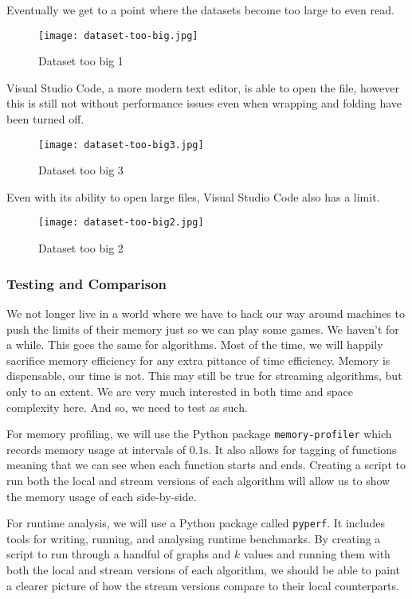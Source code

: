 Eventually we get to a point where the datasets become too large to even read.

\begin{figure}[htb]
    \centering
    \texttt{[image: dataset-too-big.jpg]}
    \caption{Dataset too big 1}
\end{figure}

Visual Studio Code, a more modern text editor, is able to open the file,
however this is still not without performance issues even when wrapping and
folding have been turned off.

\begin{figure}[htb]
    \centering
    \texttt{[image: dataset-too-big3.jpg]}
    \caption{Dataset too big 3}
\end{figure}

Even with its ability to open large files, Visual Studio Code also has a limit.

\begin{figure}[htb]
    \centering
    \texttt{[image: dataset-too-big2.jpg]}
    \caption{Dataset too big 2}
\end{figure}

\subsubsection{Testing and Comparison}

We not longer live in a world where we have to hack our way around machines to
push the limits of their memory just so we can play some games. We haven't for
a while. This goes the same for algorithms. Most of the time, we will happily
sacrifice memory efficiency for any extra pittance of time efficiency. Memory
is dispensable, our time is not. This may still be true for streaming
algorithms, but only to an extent. We are very much interested in both time and
space complexity here. And so, we need to test as such.

For memory profiling, we will use the Python package \texttt{memory-profiler}
which records memory usage at intervals of \(0.1\text{s}\). It also allows for
tagging of functions meaning that we can see when each function starts and
ends. Creating a script to run both the local and stream versions of each
algorithm will allow us to show the memory usage of each side-by-side.

For runtime analysis, we will use a Python package called \texttt{pyperf}. It
includes tools for writing, running, and analysing runtime benchmarks. By
creating a script to run through a handful of graphs and \(k\) values and
running them with both the local and stream versions of each algorithm, we
should be able to paint a clearer picture of how the stream versions compare to
their local counterparts.

